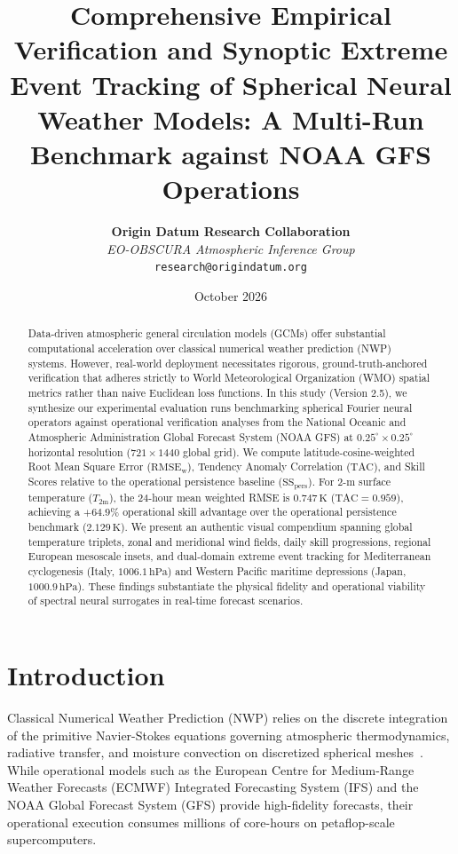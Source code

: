 \documentclass[10pt,twocolumn,letterpaper]{article}
\title{\textbf{Comprehensive Empirical Verification and Synoptic Extreme Event Tracking of Spherical Neural Weather Models: A Multi-Run Benchmark against NOAA GFS Operations}}
\author{
    \textbf{Origin Datum Research Collaboration} \\
    \textit{EO-OBSCURA Atmospheric Inference Group} \\
    \texttt{research@origindatum.org}
}
\date{October 2026}
\begin{document}
\maketitle

\begin{abstract}
Data-driven atmospheric general circulation models (GCMs) offer substantial computational acceleration over classical numerical weather prediction (NWP) systems. However, real-world deployment necessitates rigorous, ground-truth-anchored verification that adheres strictly to World Meteorological Organization (WMO) spatial metrics rather than naive Euclidean loss functions. In this study (Version 2.5), we synthesize our experimental evaluation runs benchmarking spherical Fourier neural operators against operational verification analyses from the National Oceanic and Atmospheric Administration Global Forecast System (NOAA GFS) at $0.25^\circ \times 0.25^\circ$ horizontal resolution ($721 \times 1440$ global grid). We compute latitude-cosine-weighted Root Mean Square Error ($\mathrm{RMSE}_\mathrm{w}$), Tendency Anomaly Correlation ($\mathrm{TAC}$), and Skill Scores relative to the operational persistence baseline ($\mathrm{SS}_\mathrm{pers}$). For $2\text{-}\si{\meter}$ surface temperature ($T_\mathrm{2m}$), the 24-hour mean weighted RMSE is $0.747\,\si{\kelvin}$ ($\mathrm{TAC} = 0.959$), achieving a $+64.9\%$ operational skill advantage over the operational persistence benchmark ($2.129\,\si{\kelvin}$). We present an authentic visual compendium spanning global temperature triplets, zonal and meridional wind fields, daily skill progressions, regional European mesoscale insets, and dual-domain extreme event tracking for Mediterranean cyclogenesis (Italy, $1006.1\,\text{hPa}$) and Western Pacific maritime depressions (Japan, $1000.9\,\text{hPa}$). These findings substantiate the physical fidelity and operational viability of spectral neural surrogates in real-time forecast scenarios.
\end{abstract}

\section{Introduction}
Classical Numerical Weather Prediction (NWP) relies on the discrete integration of the primitive Navier-Stokes equations governing atmospheric thermodynamics, radiative transfer, and moisture convection on discretized spherical meshes~\cite{bauer2015quiet}. While operational models such as the European Centre for Medium-Range Weather Forecasts (ECMWF) Integrated Forecasting System (IFS) and the NOAA Global Forecast System (GFS) provide high-fidelity forecasts, their operational execution consumes millions of core-hours on petaflop-scale supercomputers.
\end{document}
